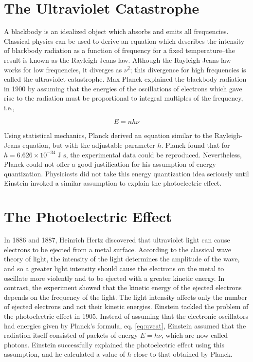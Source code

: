 \documentclass[
  9pt,
]{extbook}
\theoremstyle{definition}
\theoremstyle{definition}
\theoremstyle{definition}
\theoremstyle{remark}
\begin{document}
\hypertarget{the-ultraviolet-catastrophe}{%
\section{The Ultraviolet Catastrophe}\label{the-ultraviolet-catastrophe}}

A blackbody is an idealized object which absorbs and emits all frequencies. Classical physics can be used to derive an equation which describes the intensity of blackbody radiation as a function of frequency for a fixed temperature--the result is known as the Rayleigh-Jeans law. Although the Rayleigh-Jeans law works for low frequencies, it diverges as \(\nu^2\); this divergence for high frequencies is called the ultraviolet catastrophe.
Max Planck explained the blackbody radiation in 1900 by assuming that the energies of the oscillations of electrons which gave rise to the radiation must be proportional to integral multiples of the frequency, i.e.,

\begin{equation}
E = n h \nu
\label{eq:uvcat}
\end{equation}

Using statistical mechanics, Planck derived an equation similar to the Rayleigh-Jeans equation, but with the adjustable parameter \(h\). Planck found that for \(h = 6.626 \times 10^{-34} \; \text{J s}\), the experimental data could be reproduced. Nevertheless, Planck could not offer a good justification for his assumption of energy quantization. Physicicsts did not take this energy quantization idea seriously until Einstein invoked a similar assumption to explain the photoelectric effect.

\hypertarget{the-photoelectric-effect}{%
\section{The Photoelectric Effect}\label{the-photoelectric-effect}}

In 1886 and 1887, Heinrich Hertz discovered that ultraviolet light can cause electrons to be ejected from a metal surface. According to the classical wave theory of light, the intensity of the light determines the amplitude of the wave, and so a greater light intensity should cause the electrons on the metal to oscillate more violently and to be ejected with a greater kinetic energy. In contrast, the experiment showed that the kinetic energy of the ejected electrons depends on the frequency of the light. The light intensity affects only the number of ejected electrons and not their kinetic energies.
Einstein tackled the problem of the photoelectric effect in 1905. Instead of assuming that the electronic oscillators had energies given by Planck's formula, eq. \eqref{eq:uvcat}, Einstein assumed that the radiation itself consisted of packets of energy \(E = h \nu\), which are now called photons. Einstein successfully explained the photoelectric effect using this assumption, and he calculated a value of \(h\) close to that obtained by Planck.
\end{document}
